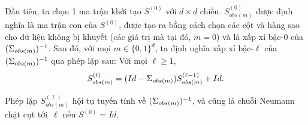 Đầu tiên, ta chọn 1 ma trận khởi tạo $S^{(0)}$ với $d \times d$ chiều. $S^{(0)}_{obs(m)}$ được định nghĩa là ma trận con của $S^{(0)}$, được tạo ra bằng cách chọn các cột và hàng sao cho dữ liệu không bị khuyết (các giá trị mà tại đó, $m = 0$)
và là xấp xỉ bậc-0 của $(\Sigma_{obs(m)})^{-1}$.
Sau đó, với mọi $m \in \{0,1\}^{d}$, ta định nghĩa xấp xỉ bậc-$\ell$ của $(\Sigma_{obs(m)})^{-1}$ qua phép lặp sau: Với mọi $\ell \geq 1$,
\begin{equation}\label{eq:iterative_fomula}
    S_{obs(m)}^{(\ell)} = (Id - \Sigma_{obs(m)}) S_{obs(m)}^{(\ell - 1)} + Id.
\end{equation}

Phép lặp $S_{obs(m)}^{(\ell)}$ hội tụ tuyến tính về $(\Sigma_{obs(m)})^{-1}$, và cũng là chuỗi Neumann chặt cụt tới~$\ell$ nếu $S^{(0)} = Id$.

